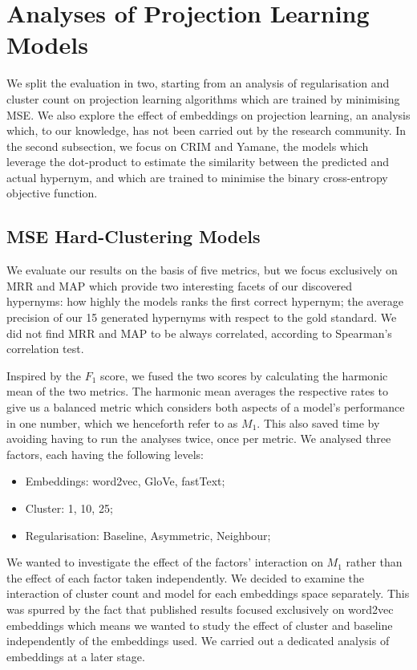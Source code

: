 \section{Analyses of Projection Learning Models}
We split the evaluation in two, starting from an analysis of regularisation and cluster count on projection learning algorithms which are trained by minimising \ac{MSE}.  We also explore the effect of embeddings on projection learning, an analysis which, to our knowledge, has not been carried out by the research community.  In the second subsection, we focus on CRIM and Yamane, the models which leverage the dot-product to estimate the similarity between the predicted and actual hypernym, and which are trained to minimise the binary cross-entropy objective function.

\subsection{MSE Hard-Clustering Models}\label{Eval_MSE}
We evaluate our results on the basis of five metrics, but we focus exclusively on \ac{MRR} and \ac{MAP} which provide two interesting facets of our discovered hypernyms: how highly the models ranks  the first correct hypernym; the average precision of our 15 generated hypernyms with respect to the gold standard.  We did not find \ac{MRR} and \ac{MAP} to be always correlated, according to Spearman's correlation test.

Inspired by the $F_1$ score, we fused the two scores by calculating the harmonic mean of the two metrics.  The harmonic mean averages the respective rates to give us a balanced metric which considers both aspects of a model's performance in one number, which we henceforth refer to as $M_1$.  This also saved time by avoiding having to run the analyses twice, once per metric.  We analysed three factors, each having the following levels:
\begin{itemize}
    \item Embeddings: word2vec, GloVe, fastText;
    \item Cluster: 1, 10, 25;
    \item Regularisation: Baseline, Asymmetric, Neighbour;
\end{itemize}

We wanted to investigate the effect of the factors' interaction on $M_1$ rather than the effect of each factor taken independently.  We decided to examine the interaction of cluster count and model for each embeddings space separately.  This was spurred by the fact that published results focused exclusively on word2vec embeddings which means we wanted to study the effect of cluster and baseline independently of the embeddings used.  We carried out a dedicated analysis of embeddings at a later stage.  

